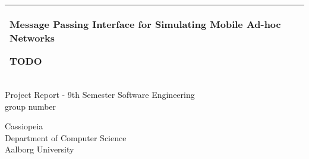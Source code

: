 %
\begin{titlepage}
  \addtolength{\hoffset}{0.5\evensidemargin-0.5\oddsidemargin} %
  \noindent%
  \begin{tabular}{@{}p{\textwidth}@{}}
    \toprule[2pt]
    \midrule
    \vspace{0.2cm}
    \begin{center}
    \Huge{\textbf{
      Message Passing Interface for Simulating Mobile Ad-hoc Networks%
    }}
    \end{center}
    \begin{center}
      \Large{
        TODO %
      }
    \end{center}
    \vspace{0.2cm}\\
    \midrule
    \toprule[2pt]
  \end{tabular}
  \vspace{4 cm}
  \begin{center}
    {\large
      Project Report - 9th Semester Software Engineering %
    }\\
    \vspace{0.2cm}
    {\Large
      group number%
    }
  \end{center}
  \vfill
  \begin{center}
  Cassiopeia\\
  Department of Computer Science\\
  Aalborg University
  \end{center}
\end{titlepage}
\clearpage
